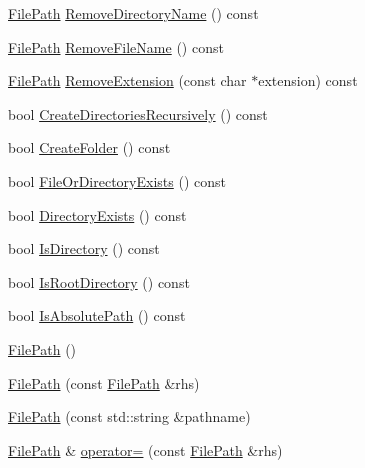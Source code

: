 \begin{DoxyCompactItemize}
\hyperlink{classtesting_1_1internal_1_1_file_path}{File\-Path} \hyperlink{classtesting_1_1internal_1_1_file_path_a2852e5a759ff2e2620c7317b8121d757}{Remove\-Directory\-Name} () const 
\item 
\hyperlink{classtesting_1_1internal_1_1_file_path}{File\-Path} \hyperlink{classtesting_1_1internal_1_1_file_path_aed3abcd0b8a7f6ed1ff0e7743ef8bf1e}{Remove\-File\-Name} () const 
\item 
\hyperlink{classtesting_1_1internal_1_1_file_path}{File\-Path} \hyperlink{classtesting_1_1internal_1_1_file_path_ab2a25cc916c111597b94d006aa973c3d}{Remove\-Extension} (const char $\ast$extension) const 
\item 
bool \hyperlink{classtesting_1_1internal_1_1_file_path_afccf35a45e209c22e68c6f8e86036c12}{Create\-Directories\-Recursively} () const 
\item 
bool \hyperlink{classtesting_1_1internal_1_1_file_path_a303cdda61bee6e8a0b0303e8fc857e36}{Create\-Folder} () const 
\item 
bool \hyperlink{classtesting_1_1internal_1_1_file_path_a3548d3ead0e94701669afc64d765ece7}{File\-Or\-Directory\-Exists} () const 
\item 
bool \hyperlink{classtesting_1_1internal_1_1_file_path_a3546b3f926935fefddb9a808e7e2be47}{Directory\-Exists} () const 
\item 
bool \hyperlink{classtesting_1_1internal_1_1_file_path_a918336f16efa8e07d4b94192d6a89f44}{Is\-Directory} () const 
\item 
bool \hyperlink{classtesting_1_1internal_1_1_file_path_a7d31c82f3f979c54e5a985382b52feb1}{Is\-Root\-Directory} () const 
\item 
bool \hyperlink{classtesting_1_1internal_1_1_file_path_a720a5f0fd00f3e98d6f3518f4dadfff5}{Is\-Absolute\-Path} () const 
\item 
\hyperlink{classtesting_1_1internal_1_1_file_path_a3504a51accbca78a52fe586133ea5499}{File\-Path} ()
\item 
\hyperlink{classtesting_1_1internal_1_1_file_path_ae9efd0fee56c6e3e2d659b464250b112}{File\-Path} (const \hyperlink{classtesting_1_1internal_1_1_file_path}{File\-Path} \&rhs)
\item 
\hyperlink{classtesting_1_1internal_1_1_file_path_a9fc072b140aa0652a7022fb809fe3abe}{File\-Path} (const std\-::string \&pathname)
\item 
\hyperlink{classtesting_1_1internal_1_1_file_path}{File\-Path} \& \hyperlink{classtesting_1_1internal_1_1_file_path_a8d9c1bafb90f10bcd5611a54d8f326ef}{operator=} (const \hyperlink{classtesting_1_1internal_1_1_file_path}{File\-Path} \&rhs)

\end{DoxyCompactItemize}
